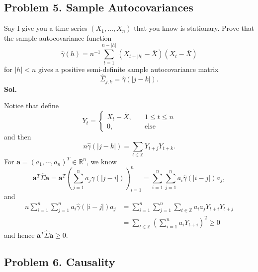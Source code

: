 \documentclass[lang=en,11pt,a4paper,citestyle =authoryear]{elegantpaper}
\newcommand{\Z}{\mathbb{Z}}
\newcommand{\R}{\mathbb{R}}
\begin{document}
\subsection*{Problem 5. Sample Autocovariances} 

Say I give you a time series $(X_1,\ldots,X_n)$ that you know is
stationary. Prove that the sample autocovariance function
\[
\widehat{\gamma}(h)
=n^{-1}\sum_{t=1}^{n-|h|}
  (X_{t+|h|}-\overline{X})(X_t-\overline{X})
\]
for $|h|<n$ gives a positive semi-definite sample autocovariance
matrix
\[
\widehat{\Sigma}_{j,k}=\widehat{\gamma}(|j-k|).
\]
\vspace{0.5em}
\textbf{Sol.} \par
Notice that define
\[
Y_t = \begin{cases}
    X_t - \overline{X},\quad &1\leq t \leq n \\
    0,\quad&\text{else}
\end{cases}
\]
and then
\[
n\widehat{\gamma}(|j-k|) = \sum\limits_{t\in\mathbb{Z}} Y_{t+j}Y_{t+k}.
\]
For $\mathbf{a} = (a_1,\cdots,a_n)^T \in \R^n$, we know
\[
    \mathbf{a}^T \widehat{\Sigma} \mathbf{a} = \mathbf{a}^T\left(\sum\limits_{j=1}^n a_j\widehat{\gamma}(|j-i|)\right)_{i=1}^n = \sum\limits_{i=1}^n\sum\limits_{j=1}^n a_i\widehat{\gamma}(|i-j|)a_j,
\]
and
\[
\begin{aligned}
    n\sum\limits_{i=1}^n\sum\limits_{j=1}^n a_i\widehat{\gamma}(|i-j|)a_j &= \sum\limits_{i=1}^n\sum\limits_{j=1}^n\sum\limits_{t\in\Z} a_ia_jY_{t+i}Y_{t+j} \\
    &= \sum\limits_{t\in\Z}\left(\sum\limits_{i=1}^n a_i Y_{t+i}\right)^2 \geq 0
\end{aligned}
\]
and hence
$\mathbf{a}^T \widehat{\Sigma} \mathbf{a} \geq 0$.
\par 
\vspace{0.5em}

\subsection*{Problem 6. Causality} 
\end{document}
